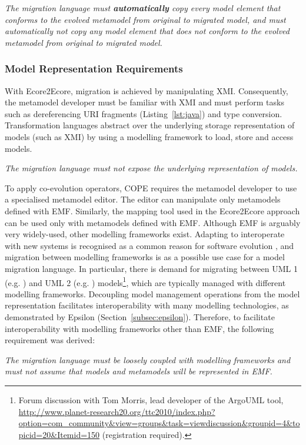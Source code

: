 \emph{The migration language must \textbf{automatically} copy every model element that conforms to the evolved metamodel from original to migrated model, and must automatically not copy any model element that does not conform to the evolved metamodel from original to migrated model.}


\subsubsection{Model Representation Requirements}
With Ecore2Ecore, migration is achieved by manipulating XMI. Consequently, the metamodel developer must be familiar with XMI and must perform tasks such as dereferencing URI fragments (Listing~\ref{lst:java}) and type conversion. Transformation languages abstract over the underlying storage representation of models (such as XMI) by using a modelling framework to load, store and access models.

\emph{The migration language must not expose the underlying representation of models.}

\vspace{5mm}

To apply co-evolution operators, COPE requires the metamodel developer to use a specialised metamodel editor. The editor can manipulate only metamodels defined with EMF. Similarly, the mapping tool used in the Ecore2Ecore approach can be used only with metamodels defined with EMF. Although EMF is arguably very widely-used, other modelling frameworks exist. Adapting to interoperate with new systems is recognised as a common reason for software evolution \cite{sjoberg93quantifying}, and migration between modelling frameworks is as a possible use case for a model migration language. In particular, there is demand for migrating between UML 1 (e.g. \cite{uml14}) and UML 2 (e.g. \cite{uml22}) models\footnote{Forum discussion with Tom Morris, lead developer of the ArgoUML tool, \url{http://www.planet-research20.org/ttc2010/index.php?option=com_community&view=groups&task=viewdiscussion&groupid=4&topicid=20&Itemid=150} (registration required).}, which are typically managed with different modelling frameworks. Decoupling model management operations from the model representation facilitates interoperability with many modelling technologies, as demonstrated by Epsilon (Section~\ref{subsec:epsilon}). Therefore, to facilitate interoperability with modelling frameworks other than EMF, the following requirement was derived:

\emph{The migration language must be loosely coupled with modelling frameworks and must not assume that models and metamodels will be represented in EMF.}